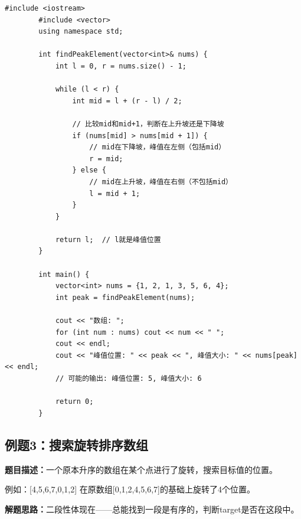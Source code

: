 \documentclass[12pt,a4paper]{article}
\begin{document}
	\begin{lstlisting}[caption={例题2：寻找峰值}]
		#include <iostream>
		#include <vector>
		using namespace std;
		
		int findPeakElement(vector<int>& nums) {
			int l = 0, r = nums.size() - 1;
			
			while (l < r) {
				int mid = l + (r - l) / 2;
				
				// 比较mid和mid+1，判断在上升坡还是下降坡
				if (nums[mid] > nums[mid + 1]) {
					// mid在下降坡，峰值在左侧（包括mid）
					r = mid;
				} else {
					// mid在上升坡，峰值在右侧（不包括mid）
					l = mid + 1;
				}
			}
			
			return l;  // l就是峰值位置
		}
		
		int main() {
			vector<int> nums = {1, 2, 1, 3, 5, 6, 4};
			int peak = findPeakElement(nums);
			
			cout << "数组: ";
			for (int num : nums) cout << num << " ";
			cout << endl;
			cout << "峰值位置: " << peak << ", 峰值大小: " << nums[peak] << endl;
			// 可能的输出: 峰值位置: 5, 峰值大小: 6
			
			return 0;
		}
	\end{lstlisting}
	
	\subsection{例题3：搜索旋转排序数组}
	
	\textbf{题目描述：}一个原本升序的数组在某个点进行了旋转，搜索目标值的位置。
	
	例如：[4,5,6,7,0,1,2] 在原数组[0,1,2,4,5,6,7]的基础上旋转了4个位置。
	
	\textbf{解题思路：}二段性体现在——总能找到一段是有序的，判断target是否在这段中。
	
\end{document}
